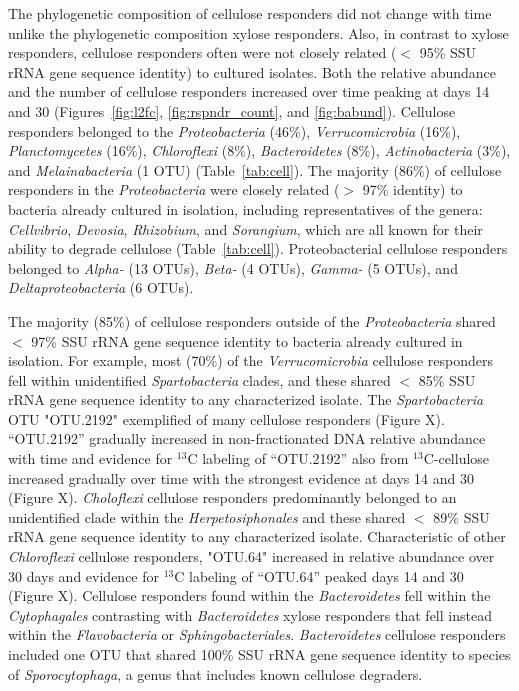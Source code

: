 The phylogenetic composition of cellulose responders did not change with
time unlike the phylogenetic composition xylose responders. Also, in
contrast to xylose responders, cellulose responders often were not closely
related ($<$ 95\% SSU rRNA gene sequence identity) to cultured isolates.
Both the relative abundance and the number of cellulose responders
increased over time peaking at days 14 and 30 (Figures~\ref{fig:l2fc},
\ref{fig:rspndr_count}, and \ref{fig:babund}). Cellulose responders belonged to the
\textit{Proteobacteria} (46\%), \textit{Verrucomicrobia} (16\%),
\textit{Planctomycetes} (16\%), \textit{Chloroflexi} (8\%),
\textit{Bacteroidetes} (8\%), \textit{Actinobacteria} (3\%), and
\textit{Melainabacteria} (1 OTU) (Table~\ref{tab:cell}). The majority (86\%)
of cellulose responders in the \textit{Proteobacteria} were closely related
($>$ 97\% identity) to bacteria already cultured in isolation, including
representatives of the genera: \textit{Cellvibrio}, \textit{Devosia},
\textit{Rhizobium}, and \textit{Sorangium}, which are all known for their
ability to degrade cellulose (Table~\ref{tab:cell}). Proteobacterial cellulose
responders belonged to \textit{Alpha-} (13 OTUs), \textit{Beta-} (4 OTUs),
\textit{Gamma-} (5 OTUs), and \textit{Deltaproteobacteria} (6 OTUs). 

The majority (85\%) of cellulose responders outside of the
\textit{Proteobacteria} shared  $<$ 97\% SSU rRNA gene sequence identity to
bacteria already cultured in isolation. For example, most (70\%) of the
\textit{Verrucomicrobia} cellulose responders fell within unidentified
\textit{Spartobacteria} clades, and these shared $<$ 85\% SSU rRNA gene
sequence identity to any characterized isolate. The \textit{Spartobacteria} OTU
"OTU.2192" exemplified of many cellulose responders (Figure X). ``OTU.2192''
gradually increased in non-fractionated DNA relative abundance with time and
evidence for $^{13}$C labeling of ``OTU.2192'' also from $^{13}$C-cellulose
increased gradually over time with the strongest evidence at days 14 and
30 (Figure X). \textit{Choloflexi} cellulose responders predominantly belonged
to an unidentified clade within the \textit{Herpetosiphonales} and these
shared $<$ 89\% SSU rRNA gene sequence identity to any characterized
isolate. Characteristic of other \textit{Chloroflexi} cellulose responders,
"OTU.64" increased in relative abundance over 30 days and evidence for
$^{13}$C labeling of ``OTU.64'' peaked days 14 and 30 (Figure X).
Cellulose responders found within the \textit{Bacteroidetes} fell within
the \textit{Cytophagales} contrasting with \textit{Bacteroidetes} xylose
responders that fell instead within the \textit{Flavobacteria} or
\textit{Sphingobacteriales}. \textit{Bacteroidetes} cellulose responders
included one OTU that shared 100\% SSU rRNA gene sequence identity to
species of \textit{Sporocytophaga}, a genus that includes known cellulose
degraders.

